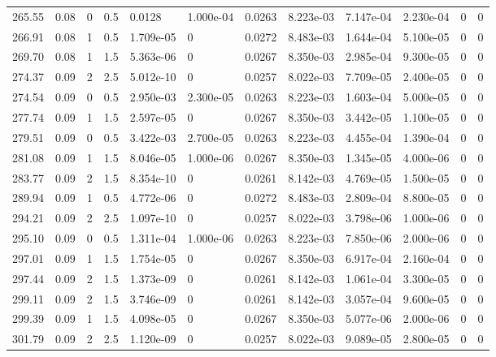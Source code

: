 \documentclass[preview]{standalone}
\begin{document}
{{\begin{tabular}{L{1.2cm}C{1.2cm} C{0.3cm}C{0.5cm} C{1.4cm}C{1.4cm} C{1.4cm}C{1.4cm} C{1.6cm}C{1.6cm} C{1.6cm}C{1.6cm}}
  265.55  &  0.08  & 0     & 0.5 &  0.0128  & 1.000e-04  &  0.0263&   8.223e-03& 7.147e-04 & 2.230e-04   &  0 & 0  \\ 
  266.91  &  0.08  & 1     & 0.5 &  1.709e-05  & 0  &  0.0272&   8.483e-03& 1.644e-04 & 5.100e-05   &  0 & 0  \\ 
  269.70  &  0.08  & 1     & 1.5 &  5.363e-06  & 0  &  0.0267&   8.350e-03& 2.985e-04 & 9.300e-05   &  0 & 0  \\ 
  274.37  &  0.09  & 2     & 2.5 &  5.012e-10  & 0  &  0.0257&   8.022e-03& 7.709e-05 & 2.400e-05   &  0 & 0  \\ 
  274.54  &  0.09  & 0     & 0.5 &  2.950e-03  & 2.300e-05  &  0.0263&   8.223e-03& 1.603e-04 & 5.000e-05   &  0 & 0  \\ 
  277.74  &  0.09  & 1     & 1.5 &  2.597e-05  & 0  &  0.0267&   8.350e-03& 3.442e-05 & 1.100e-05   &  0 & 0  \\ 
  279.51  &  0.09  & 0     & 0.5 &  3.422e-03  & 2.700e-05  &  0.0263&   8.223e-03& 4.455e-04 & 1.390e-04   &  0 & 0  \\ 
  281.08  &  0.09  & 1     & 1.5 &  8.046e-05  & 1.000e-06  &  0.0267&   8.350e-03& 1.345e-05 & 4.000e-06   &  0 & 0  \\ 
  283.77  &  0.09  & 2     & 1.5 &  8.354e-10  & 0  &  0.0261&   8.142e-03& 4.769e-05 & 1.500e-05   &  0 & 0  \\ 
  289.94  &  0.09  & 1     & 0.5 &  4.772e-06  & 0  &  0.0272&   8.483e-03& 2.809e-04 & 8.800e-05   &  0 & 0  \\ 
  294.21  &  0.09  & 2     & 2.5 &  1.097e-10  & 0  &  0.0257&   8.022e-03& 3.798e-06 & 1.000e-06   &  0 & 0  \\ 
  295.10  &  0.09  & 0     & 0.5 &  1.311e-04  & 1.000e-06  &  0.0263&   8.223e-03& 7.850e-06 & 2.000e-06   &  0 & 0  \\ 
  297.01  &  0.09  & 1     & 1.5 &  1.754e-05  & 0  &  0.0267&   8.350e-03& 6.917e-04 & 2.160e-04   &  0 & 0  \\ 
  297.44  &  0.09  & 2     & 1.5 &  1.373e-09  & 0  &  0.0261&   8.142e-03& 1.061e-04 & 3.300e-05   &  0 & 0  \\ 
  299.11  &  0.09  & 2     & 1.5 &  3.746e-09  & 0  &  0.0261&   8.142e-03& 3.057e-04 & 9.600e-05   &  0 & 0  \\ 
  299.39  &  0.09  & 1     & 1.5 &  4.098e-05  & 0  &  0.0267&   8.350e-03& 5.077e-06 & 2.000e-06   &  0 & 0  \\ 
  301.79  &  0.09  & 2     & 2.5 &  1.120e-09  & 0  &  0.0257&   8.022e-03& 9.089e-05 & 2.800e-05   &  0 & 0  \\ 

\end{tabular}}}
\end{document}
